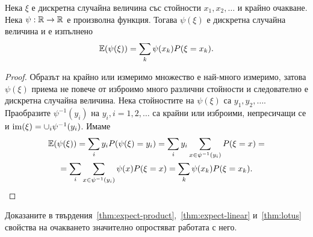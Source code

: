 \documentclass[numbers=endperiod, DIV=15, bibliography=totocnumbered]{scrartcl}
\begin{document}
\begin{proposition}\label{thm:lotus}
  Нека $\xi$ е дискретна случайна величина със стойности $x_1, x_2, \ldots$ и крайно очакване. Нека $\psi: \mathbb{R} \to \mathbb{R}$ е произволна функция. Тогава $\psi(\xi)$ е дискретна случайна величина и е изпълнено
  \begin{displaymath}
    \mathbb{E}(\psi(\xi))
    =
    \sum_k \psi(x_k) P(\xi = x_k).
  \end{displaymath}
\end{proposition}

\begin{proof}
  Образът на крайно или измеримо множество е най-много измеримо, затова $\psi(\xi)$ приема не повече от изброимо много различни стойности и следователно е дискретна случайна величина. Нека стойностите на $\psi(\xi)$ са $y_1, y_2, \ldots$. Праобразите $\psi^{-1}(y_i)$ на $y_i, i = 1, 2, \ldots$ са крайни или изброими, непресичащи се и $\operatorname{im}(\xi) = \cup_i \psi^{-1}(y_i)$. Имаме
  \begin{multline*}
    \mathbb{E}(\psi(\xi))
    =
    \sum_i y_i P(\psi(\xi) = y_i)
    =
    \sum_i y_i \sum_{x \in \psi^{-1}(y_i)} P(\xi = x)
    = \\ =
    \sum_i \sum_{x \in \psi^{-1}(y_i)} \psi(x) P(\xi = x)
    =
    \sum_k \psi(x_k) P(\xi = x_k).
  \end{multline*}
\end{proof}

Доказаните в твърдения~\ref{thm:expect-product},~\ref{thm:expect-linear} и~\ref{thm:lotus} свойства на очакването значително опростяват работата с него.
\end{document}
